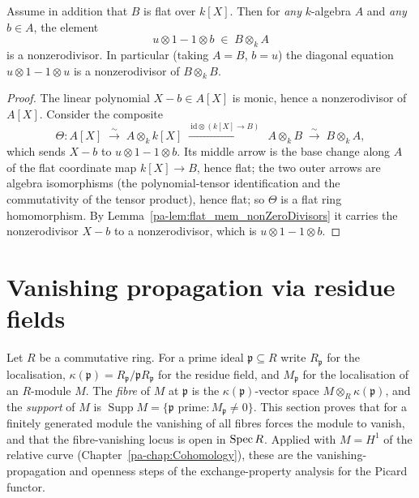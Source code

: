 \begin{theorem}
  \label{pa-thm:diagonal_regularity_engine}
  \leanok

  Assume in addition that \(B\) is flat over \(k[X]\). Then for \emph{any} \(k\)-algebra \(A\) and
  \emph{any} \(b \in A\), the element
  \[
    u \otimes 1 - 1 \otimes b \;\in\; B \otimes_k A
  \]
  is a nonzerodivisor. In particular (taking \(A = B\), \(b = u\)) the diagonal equation \(u
  \otimes 1 - 1 \otimes u\) is a nonzerodivisor of \(B \otimes_k B\).
\end{theorem}
\begin{proof}
  \leanok
  The linear polynomial \(X - b \in A[X]\) is monic, hence a nonzerodivisor of \(A[X]\). Consider
  the composite
  \[
    \Theta \colon A[X] \;\xrightarrow{\ \sim\ }\; A \otimes_k k[X]
    \;\xrightarrow{\ \mathrm{id} \otimes (k[X] \to B)\ }\; A \otimes_k B
    \;\xrightarrow{\ \sim\ }\; B \otimes_k A,
  \]
  which sends \(X - b\) to \(u \otimes 1 - 1 \otimes b\). Its middle arrow is the base change
  along \(A\) of the flat coordinate map \(k[X] \to B\), hence flat; the two outer arrows are
  algebra isomorphisms (the polynomial-tensor identification and the commutativity of the tensor
  product), hence flat; so \(\Theta\) is a flat ring homomorphism. By
  Lemma~\ref{pa-lem:flat_mem_nonZeroDivisors} it carries the nonzerodivisor \(X - b\) to a
  nonzerodivisor, which is \(u \otimes 1 - 1 \otimes b\).
\end{proof}

\section{Vanishing propagation via residue fields}
\label{pa-sec:nakayama_vanishing}

Let \(R\) be a commutative ring. For a prime ideal \(\mathfrak p \subseteq R\) write
\(R_{\mathfrak p}\) for the localisation, \(\kappa(\mathfrak p) =
R_{\mathfrak p}/\mathfrak p R_{\mathfrak p}\) for the residue field, and
\(M_{\mathfrak p}\) for the localisation of an \(R\)-module \(M\). The \emph{fibre} of
\(M\) at \(\mathfrak p\) is the \(\kappa(\mathfrak p)\)-vector space
\(M \otimes_R \kappa(\mathfrak p)\), and the \emph{support} of \(M\) is
\(\operatorname{Supp} M = \{\mathfrak p \text{ prime} : M_{\mathfrak p} \neq 0\}\).
This section proves that for a finitely generated module the vanishing of all fibres
forces the module to vanish, and that the fibre-vanishing locus is open in
\(\operatorname{Spec} R\). Applied with \(M = H^1\) of the relative curve
(Chapter~\ref{pa-chap:Cohomology}), these are the vanishing-propagation and openness steps
of the exchange-property analysis for the Picard functor.

